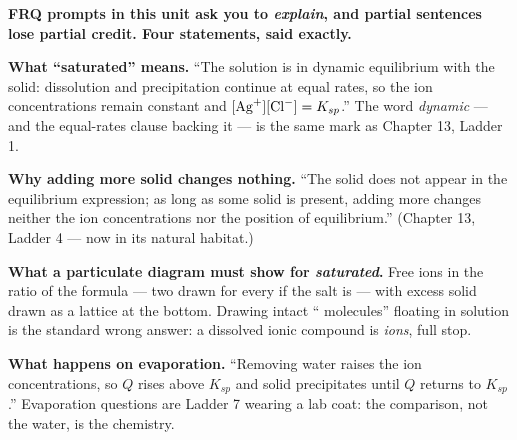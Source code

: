 \documentclass{apchem-worksheet}
\begin{document}
\begin{workedexample}
\textbf{FRQ prompts in this unit ask you to \emph{explain}, and partial
sentences lose partial credit. Four statements, said exactly.}

\textbf{What ``saturated'' means.} ``The solution is in dynamic
equilibrium with the solid: dissolution and precipitation continue at
equal rates, so the ion concentrations remain constant and
$[\ce{Ag+}][\ce{Cl-}] = K_{sp}$.'' The word \emph{dynamic} --- and the
equal-rates clause backing it --- is the same mark as Chapter 13,
Ladder 1.

\textbf{Why adding more solid changes nothing.} ``The solid does not
appear in the equilibrium expression; as long as some solid is present,
adding more changes neither the ion concentrations nor the position of
equilibrium.'' (Chapter 13, Ladder 4 --- now in its natural habitat.)

\textbf{What a particulate diagram must show for \emph{saturated}.}
Free ions in the ratio of the formula --- two  drawn for every
 if the salt is  --- with excess solid drawn as
a lattice at the bottom. Drawing intact `` molecules''
floating in solution is the standard wrong answer: a dissolved ionic
compound is \emph{ions}, full stop.

\textbf{What happens on evaporation.} ``Removing water raises the ion
concentrations, so $Q$ rises above $K_{sp}$ and solid precipitates
until $Q$ returns to $K_{sp}$.'' Evaporation questions are Ladder 7
wearing a lab coat: the comparison, not the water, is the chemistry.
\end{workedexample}
\end{document}
